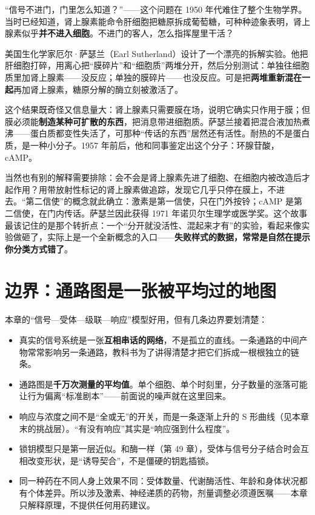 \begin{zhengju}
“信号不进门，门里怎么知道？”——这个问题在 1950 年代难住了整个生物学界。当时已经知道，肾上腺素能命令肝细胞把糖原拆成葡萄糖，可种种迹象表明，肾上腺素似乎\textbf{并不进入细胞}。不进门的客人，怎么指挥屋里干活？

美国生化学家厄尔·萨瑟兰（Earl Sutherland）设计了一个漂亮的拆解实验。他把肝细胞打碎，用离心把“膜碎片”和“细胞质”两堆分开，然后分别测试：单独往细胞质里加肾上腺素——没反应；单独的膜碎片——也没反应。可是把\textbf{两堆重新混在一起}再加肾上腺素，糖原分解的酶立刻被激活了。

这个结果既奇怪又信息量大：肾上腺素只需要膜在场，说明它确实只作用于膜；但膜必须能\textbf{制造某种可扩散的东西}，把消息带进细胞质。萨瑟兰接着把混合液加热煮沸——蛋白质都变性失活了，可那种“传话的东西”居然还有活性。耐热的不是蛋白质，是一种小分子。1957 年前后，他和同事鉴定出这个分子：环腺苷酸，cAMP。

当然也有别的解释需要排除：会不会是肾上腺素先进了细胞、在细胞内被改造后才起作用？用带放射性标记的肾上腺素做追踪，发现它几乎只停在膜上，不进去。“第二信使”的概念就此确立：激素是第一信使，只在门外按铃；cAMP 是第二信使，在门内传话。萨瑟兰因此获得 1971 年诺贝尔生理学或医学奖。这个故事最该记住的是那个转折点：一个“分开就没活性、混起来才有”的实验，看起来像实验做砸了，实际上是一个全新概念的入口——\textbf{失败样式的数据，常常是自然在提示你分类方式错了}。
\end{zhengju}

\section{边界：通路图是一张被平均过的地图}

本章的“信号—受体—级联—响应”模型好用，但有几条边界要划清楚：

\begin{itemize}[itemsep=2pt]
\item 真实的信号系统是一张\textbf{互相串话的网络}，不是孤立的直线。一条通路的中间产物常常影响另一条通路，教科书为了讲得清楚才把它们拆成一根根独立的链条。
\item 通路图是\textbf{千万次测量的平均值}。单个细胞、单个时刻里，分子数量的涨落可能让行为偏离“标准剧本”——前面说的噪声就在这里回来。
\item 响应与浓度之间不是“全或无”的开关，而是一条逐渐上升的 S 形曲线（见本章末的挑战层）。“有没有响应”其实是“响应强到什么程度”。
\item 锁钥模型只是第一层近似。和酶一样（第 49 章），受体与信号分子结合时会互相改变形状，是“诱导契合”，不是僵硬的钥匙插锁。
\item 同一种药在不同人身上效果不同：受体数量、代谢酶活性、年龄和身体状况都有个体差异。所以涉及激素、神经递质的药物，剂量调整必须遵医嘱——本章只解释原理，不提供任何用药建议。
\end{itemize}

